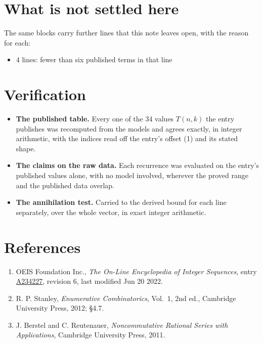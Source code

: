 \documentclass[11pt]{article}
\theoremstyle{definition}
\begin{document}
\section{What is not settled here}

The same blocks carry further lines that this note leaves open, with the reason for each:

\begin{itemize}

\item 4 lines: fewer than six published terms in that line

\end{itemize}

\section{Verification}

\begin{itemize}

\item {\bfseries The published table.} Every one of the 34 values $T(n,k)$ the entry publishes was recomputed from the models and agrees exactly, in integer arithmetic, with the indices read off the entry's offset (1) and its stated shape.

\item {\bfseries The claims on the raw data.} Each recurrence was evaluated on the entry's published values alone, with no model involved, wherever the proved range and the published data overlap.

\item {\bfseries The annihilation test.} Carried to the derived bound for each line separately, over the whole vector, in exact integer arithmetic.

\end{itemize}

\section{References}

\begin{enumerate}

\item OEIS Foundation Inc., \emph{The On-Line Encyclopedia of Integer Sequences}, entry \href{https://oeis.org/A234227}{A234227}, revision 6, last modified Jun 20 2022.

\item R. P. Stanley, \emph{Enumerative Combinatorics}, Vol.~1, 2nd ed., Cambridge University Press, 2012; \S4.7.

\item J. Berstel and C. Reutenauer, \emph{Noncommutative Rational Series with Applications}, Cambridge University Press, 2011.

\end{enumerate}
\end{document}
